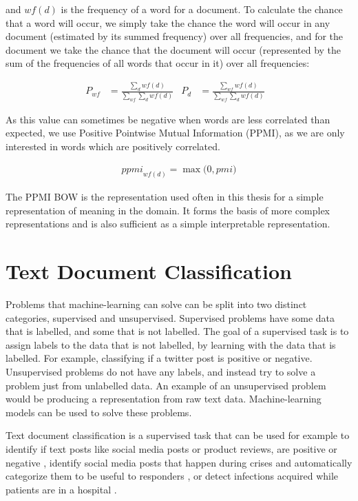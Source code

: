 and ${wf}(d)$ is the frequency of a word for a document. To calculate the chance that a word will occur, we simply take the chance the word will occur in any document (estimated by its summed frequency) over all frequencies, and for the document we take the chance that the document  will occur (represented by the sum of the  frequencies of all words that occur in it) over all frequencies:

\begin{align*}
P_{wf} &= \frac{\sum_{d} {wf}(d)}{\sum_{wf} \sum_{d} {wf}(d)} &
P_{d} &= \frac{\sum_{wf} {wf}(d)}{\sum_{wf} \sum_{d} {wf}(d)} &
\end{align*}



As this value can sometimes be negative when words are less correlated than expected, we use Positive Pointwise Mutual Information (PPMI), as we are only interested in words which are positively correlated.

\begin{align*}
\textit{ppmi}_{{wf}(d)} = \max \big(0, pmi)
\end{align*}


The PPMI BOW is the representation used often in this thesis for a simple representation of meaning in the domain. It forms the basis of more complex representations and is also sufficient as a simple interpretable representation.

\section{Text Document Classification}\label{ch2:classifiers}

Problems that machine-learning can solve can be split into two distinct categories, supervised and unsupervised. Supervised problems have some data that is labelled, and some that is not labelled. The goal of a supervised task is to assign labels to the data that is not labelled, by learning with the data that is labelled. For example, classifying if a twitter post is positive or negative. Unsupervised problems do not have any labels, and instead try to solve a problem just from unlabelled data. An example of an unsupervised problem would be producing a representation from raw text data. Machine-learning models can be used to solve these problems.

Text document classification is a supervised task that can be used for example to identify if text posts like social media posts or product reviews, are positive or negative \cite{Burel2018},  identify social media posts that happen during crises and automatically categorize them to be useful to responders \cite{Burel2018},  or detect infections acquired while patients are in a hospital . 

